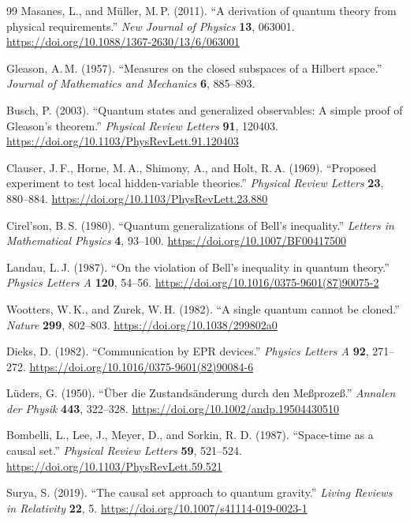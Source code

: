 \documentclass[11pt]{article}
\theoremstyle{definition}
\theoremstyle{remark}
\begin{document}
{\begin{thebibliography}{99}
Masanes, L., and M\"uller, M.\,P. (2011).
``A derivation of quantum theory from physical requirements.''
\emph{New Journal of Physics} \textbf{13}, 063001.
\url{https://doi.org/10.1088/1367-2630/13/6/063001}

Gleason, A.\,M. (1957). ``Measures on the closed subspaces of a Hilbert
space.'' \emph{Journal of Mathematics and Mechanics} \textbf{6}, 885--893.

Busch, P. (2003). ``Quantum states and generalized observables: A simple
proof of Gleason's theorem.'' \emph{Physical Review Letters} \textbf{91},
120403. \url{https://doi.org/10.1103/PhysRevLett.91.120403}

Clauser, J.\,F., Horne, M.\,A., Shimony, A., and Holt, R.\,A. (1969).
``Proposed experiment to test local hidden-variable theories.''
\emph{Physical Review Letters} \textbf{23}, 880--884.
\url{https://doi.org/10.1103/PhysRevLett.23.880}

Cirel'son, B.\,S. (1980). ``Quantum generalizations of Bell's inequality.''
\emph{Letters in Mathematical Physics} \textbf{4}, 93--100.
\url{https://doi.org/10.1007/BF00417500}

Landau, L.\,J. (1987). ``On the violation of Bell's inequality in quantum
theory.'' \emph{Physics Letters A} \textbf{120}, 54--56.
\url{https://doi.org/10.1016/0375-9601(87)90075-2}

Wootters, W.\,K., and Zurek, W.\,H. (1982). ``A single quantum cannot be
cloned.'' \emph{Nature} \textbf{299}, 802--803.
\url{https://doi.org/10.1038/299802a0}

Dieks, D. (1982). ``Communication by EPR devices.'' \emph{Physics Letters A}
\textbf{92}, 271--272. \url{https://doi.org/10.1016/0375-9601(82)90084-6}

L\"uders, G. (1950). ``\"Uber die Zustands\"anderung durch den
Me{\ss}proze{\ss}.'' \emph{Annalen der Physik} \textbf{443}, 322--328.
\url{https://doi.org/10.1002/andp.19504430510}

Bombelli, L., Lee, J., Meyer, D., and Sorkin, R. D. (1987). ``Space-time
as a causal set.'' \emph{Physical Review Letters} \textbf{59}, 521--524.
\url{https://doi.org/10.1103/PhysRevLett.59.521}

Surya, S. (2019). ``The causal set approach to quantum gravity.''
\emph{Living Reviews in Relativity} \textbf{22}, 5.
\url{https://doi.org/10.1007/s41114-019-0023-1}


\end{thebibliography}}
\end{document}
